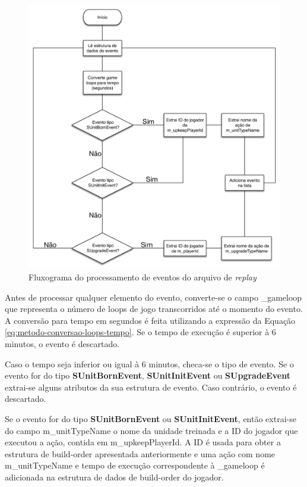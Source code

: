 \begin{figure}[htb]
	\caption{\label{fig:impl-event-fluxogram} Fluxograma do processamento de eventos do arquivo de \textit{\gls{replay}}}
	\begin{center}
	    \includegraphics[width=\linewidth]{Images/Replay-Event_Parsing-Fluxogram.pdf}
	\end{center}
\end{figure}

Antes de processar qualquer elemento do evento, converte-se o campo \_gameloop que representa o número de loops de jogo transcorridos até o momento do evento. A conversão para tempo em segundos é feita utilizando a expressão da Equação \ref{eq:metodo-conversao-loops-tempo}. Se o tempo de execução é superior à 6 minutos, o evento é descartado.

Caso o tempo seja inferior ou igual à 6 minutos, checa-se o tipo de evento. Se o evento for do tipo \textbf{SUnitBornEvent}, \textbf{SUnitInitEvent} ou \textbf{SUpgradeEvent} extrai-se alguns atributos da sua estrutura de evento. Caso contrário, o evento é descartado.

Se o evento for do tipo \textbf{SUnitBornEvent} ou \textbf{SUnitInitEvent}, então extrai-se do campo m\_unitTypeName o nome da \gls{unidade} treinada e a ID do jogador que executou a ação, contida em m\_upkeepPlayerId. A ID é usada para obter a estrutura de \gls{build-order} apresentada anteriormente e uma ação com nome m\_unitTypeName e tempo de execução correspondente à \_gameloop é adicionada na estrutura de dados de \gls{build-order} do jogador.

